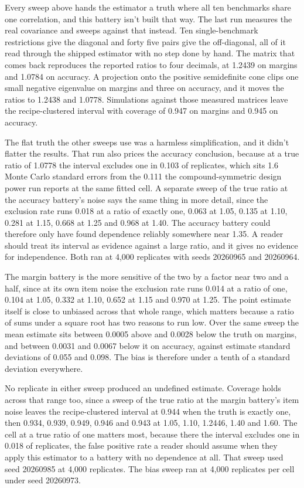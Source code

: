Every sweep above hands the estimator a truth where all ten benchmarks share one correlation, and this battery isn't built that way. The last run measures the real covariance and sweeps against that instead. Ten single-benchmark restrictions give the diagonal and forty five pairs give the off-diagonal, all of it read through the shipped estimator with no step done by hand. The matrix that comes back reproduces the reported ratios to four decimals, at 1.2439 on margins and 1.0784 on accuracy. A projection onto the positive semidefinite cone clips one small negative eigenvalue on margins and three on accuracy, and it moves the ratios to 1.2438 and 1.0778. Simulations against those measured matrices leave the recipe-clustered interval with coverage of 0.947 on margins and 0.945 on accuracy.

The flat truth the other sweeps use was a harmless simplification, and it didn't flatter the results. That run also prices the accuracy conclusion, because at a true ratio of 1.0778 the interval excludes one in 0.103 of replicates, which sits 1.6 Monte Carlo standard errors from the 0.111 the compound-symmetric design power run reports at the same fitted cell. A separate sweep of the true ratio at the accuracy battery's noise says the same thing in more detail, since the exclusion rate runs 0.018 at a ratio of exactly one, 0.063 at 1.05, 0.135 at 1.10, 0.281 at 1.15, 0.668 at 1.25 and 0.968 at 1.40. The accuracy battery could therefore only have found dependence reliably somewhere near 1.35. A reader should treat its interval as evidence against a large ratio, and it gives no evidence for independence. Both ran at 4,000 replicates with seeds 20260965 and 20260964.

The margin battery is the more sensitive of the two by a factor near two and a half, since at its own item noise the exclusion rate runs 0.014 at a ratio of one, 0.104 at 1.05, 0.332 at 1.10, 0.652 at 1.15 and 0.970 at 1.25. The point estimate itself is close to unbiased across that whole range, which matters because a ratio of sums under a square root has two reasons to run low. Over the same sweep the mean estimate sits between 0.0005 above and 0.0028 below the truth on margins, and between 0.0031 and 0.0067 below it on accuracy, against estimate standard deviations of 0.055 and 0.098. The bias is therefore under a tenth of a standard deviation everywhere.

No replicate in either sweep produced an undefined estimate. Coverage holds across that range too, since a sweep of the true ratio at the margin battery's item noise leaves the recipe-clustered interval at 0.944 when the truth is exactly one, then 0.934, 0.939, 0.949, 0.946 and 0.943 at 1.05, 1.10, 1.2446, 1.40 and 1.60. The cell at a true ratio of one matters most, because there the interval excludes one in 0.018 of replicates, the false positive rate a reader should assume when they apply this estimator to a battery with no dependence at all. That sweep used seed 20260985 at 4,000 replicates. The bias sweep ran at 4,000 replicates per cell under seed 20260973.

